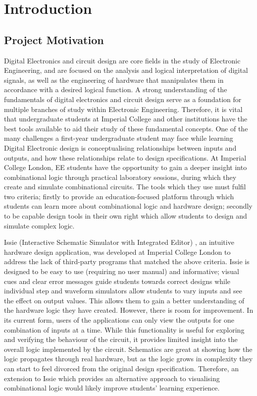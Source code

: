 \clearpage
{}

\chapter{Introduction}

\section{Project Motivation}

Digital Electronics and circuit design are core fields in the study of Electronic Engineering, and are focused on the analysis and logical interpretation of digital signals, as well as the engineering of hardware that manipulates them in accordance with a desired logical function. A strong understanding of the fundamentals of digital electronics and circuit design serve as a foundation for multiple branches of study within Electronic Engineering. Therefore, it is vital that undergraduate students at Imperial College and other institutions have the best tools available to aid their study of these fundamental concepts.
One of the many challenges a first-year undergraduate student may face while learning Digital Electronic design is conceptualising relationships between inputs and outputs, and how these relationships relate to design specifications. At Imperial College London, EE students have the opportunity to gain a deeper insight into combinational logic through practical laboratory sessions, during which they create and simulate combinational circuits. The tools which they use must fulfil two criteria; firstly to provide an education-focused platform through which students can learn more about combinational logic and hardware design; secondly to be capable design tools in their own right which allow students to design and simulate complex logic.

Issie (Interactive Schematic Simulator with Integrated Editor) \cite{issie_repo}, an intuitive hardware design application, was developed at Imperial College London to address the lack of third-party programs that matched the above criteria. Issie is designed to be easy to use (requiring no user manual) and informative; visual cues and clear error messages guide students towards correct designs while individual step and waveform simulators allow students to vary inputs and see the effect on output values. This allows them to gain a better understanding of the hardware logic they have created. However, there is room for improvement.
In its current form, users of the applications can only view the outputs for one combination of inputs at a time. While this functionality is useful for exploring and verifying the behaviour of the circuit, it provides limited insight into the overall logic implemented by the circuit. Schematics are great at showing how the logic propagates through real hardware, but as the logic grows in complexity they can start to feel divorced from the original design specification. Therefore, an extension to Issie which provides an alternative approach to visualising combinational logic would likely improve students' learning experience. 

